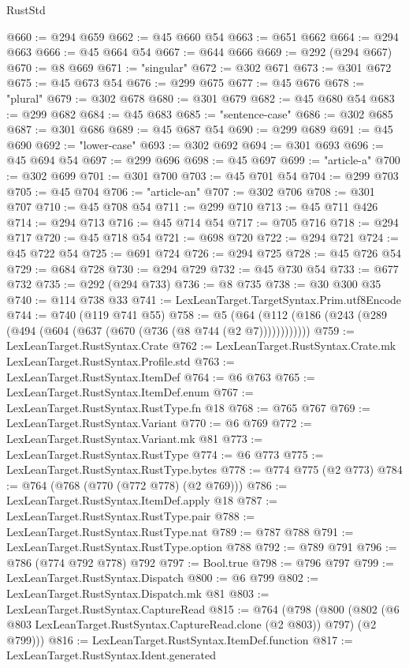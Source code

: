\begin{lexlean}{RustStd}
\begin{coremodule}
@660 := @294 @659
@662 := @45 @660 @54
@663 := @651 @662
@664 := @294 @663
@666 := @45 @664 @54
@667 := @644 @666
@669 := @292 (@294 @667)
@670 := @8 @669
@671 := "singular"
@672 := @302 @671
@673 := @301 @672
@675 := @45 @673 @54
@676 := @299 @675
@677 := @45 @676
@678 := "plural"
@679 := @302 @678
@680 := @301 @679
@682 := @45 @680 @54
@683 := @299 @682
@684 := @45 @683
@685 := "sentence-case"
@686 := @302 @685
@687 := @301 @686
@689 := @45 @687 @54
@690 := @299 @689
@691 := @45 @690
@692 := "lower-case"
@693 := @302 @692
@694 := @301 @693
@696 := @45 @694 @54
@697 := @299 @696
@698 := @45 @697
@699 := "article-a"
@700 := @302 @699
@701 := @301 @700
@703 := @45 @701 @54
@704 := @299 @703
@705 := @45 @704
@706 := "article-an"
@707 := @302 @706
@708 := @301 @707
@710 := @45 @708 @54
@711 := @299 @710
@713 := @45 @711 @426
@714 := @294 @713
@716 := @45 @714 @54
@717 := @705 @716
@718 := @294 @717
@720 := @45 @718 @54
@721 := @698 @720
@722 := @294 @721
@724 := @45 @722 @54
@725 := @691 @724
@726 := @294 @725
@728 := @45 @726 @54
@729 := @684 @728
@730 := @294 @729
@732 := @45 @730 @54
@733 := @677 @732
@735 := @292 (@294 @733)
@736 := @8 @735
@738 := @30 @300 @35
@740 := @114 @738 @33
@741 := LexLeanTarget.TargetSyntax.Prim.utf8Encode
@744 := @740 (@119 @741 @55)
@758 := @5 (@64 (@112 (@186 (@243 (@289 (@494 (@604 (@637 (@670 (@736 (@8 @744 (@2 @7))))))))))))
@759 := LexLeanTarget.RustSyntax.Crate
@762 := LexLeanTarget.RustSyntax.Crate.mk LexLeanTarget.RustSyntax.Profile.std
@763 := LexLeanTarget.RustSyntax.ItemDef
@764 := @6 @763
@765 := LexLeanTarget.RustSyntax.ItemDef.enum
@767 := LexLeanTarget.RustSyntax.RustType.fn @18
@768 := @765 @767
@769 := LexLeanTarget.RustSyntax.Variant
@770 := @6 @769
@772 := LexLeanTarget.RustSyntax.Variant.mk @81
@773 := LexLeanTarget.RustSyntax.RustType
@774 := @6 @773
@775 := LexLeanTarget.RustSyntax.RustType.bytes
@778 := @774 @775 (@2 @773)
@784 := @764 (@768 (@770 (@772 @778) (@2 @769)))
@786 := LexLeanTarget.RustSyntax.ItemDef.apply @18
@787 := LexLeanTarget.RustSyntax.RustType.pair
@788 := LexLeanTarget.RustSyntax.RustType.nat
@789 := @787 @788
@791 := LexLeanTarget.RustSyntax.RustType.option @788
@792 := @789 @791
@796 := @786 (@774 @792 @778) @792
@797 := Bool.true
@798 := @796 @797
@799 := LexLeanTarget.RustSyntax.Dispatch
@800 := @6 @799
@802 := LexLeanTarget.RustSyntax.Dispatch.mk @81
@803 := LexLeanTarget.RustSyntax.CaptureRead
@815 := @764
    (@798
      (@800 (@802 (@6 @803 LexLeanTarget.RustSyntax.CaptureRead.clone (@2 @803)) @797) (@2 @799)))
@816 := LexLeanTarget.RustSyntax.ItemDef.function
@817 := LexLeanTarget.RustSyntax.Ident.generated

\end{coremodule}
\end{lexlean}
